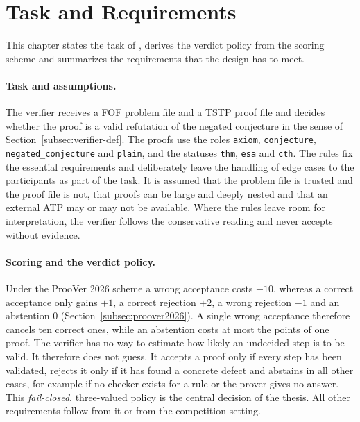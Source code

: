 \section{Task and Requirements}
\label{sec:requirements}

This chapter states the task of \TSTPy{}, derives the verdict policy from the scoring scheme and summarizes the requirements that the design has to meet.

\paragraph{Task and assumptions.}
\label{subsec:req-context}

The verifier receives a FOF problem file and a TSTP proof file and decides whether the proof is a valid refutation of the negated conjecture in the sense of Section~\ref{subsec:verifier-def}.
The proofs use the roles \texttt{axiom}, \texttt{conjecture}, \texttt{negated\_conjecture} and \texttt{plain}, and the statuses \texttt{thm}, \texttt{esa} and \texttt{cth}.
The rules fix the essential requirements and deliberately leave the handling of edge cases to the participants as part of the task.
It is assumed that the problem file is trusted and the proof file is not, that proofs can be large and deeply nested and that an external ATP may or may not be available.
Where the rules leave room for interpretation, the verifier follows the conservative reading and never accepts without evidence.

\paragraph{Scoring and the verdict policy.}
\label{subsec:req-scoring}

Under the ProoVer 2026 scheme a wrong acceptance costs $-10$, whereas a correct acceptance only gains $+1$, a correct rejection $+2$, a wrong rejection $-1$ and an abstention $0$ (Section~\ref{subsec:proover2026}).
A single wrong acceptance therefore cancels ten correct ones, while an abstention costs at most the points of one proof.
The verifier has no way to estimate how likely an undecided step is to be valid. It therefore does not guess.
It accepts a proof only if every step has been validated, rejects it only if it has found a concrete defect and abstains in all other cases, for example if no checker exists for a rule or the prover gives no answer.
This \emph{fail-closed}, three-valued policy is the central decision of the thesis. All other requirements follow from it or from the competition setting.

